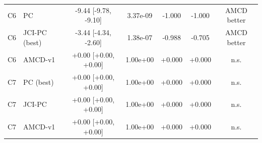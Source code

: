 \begin{tabular}{llccccc}
C6 & PC & -9.44 [-9.78, -9.10] & 3.37e-09 & -1.000 & -1.000 & AMCD better \\
C6 & JCI-PC (best) & -3.44 [-4.34, -2.60] & 1.38e-07 & -0.988 & -0.705 & AMCD better \\
C6 & AMCD-v1 & +0.00 [+0.00, +0.00] & 1.00e+00 & +0.000 & +0.000 & n.s. \\
C7 & PC (best) & +0.00 [+0.00, +0.00] & 1.00e+00 & +0.000 & +0.000 & n.s. \\
C7 & JCI-PC & +0.00 [+0.00, +0.00] & 1.00e+00 & +0.000 & +0.000 & n.s. \\
C7 & AMCD-v1 & +0.00 [+0.00, +0.00] & 1.00e+00 & +0.000 & +0.000 & n.s. \\
\bottomrule
\end{tabular}
